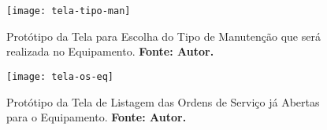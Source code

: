 \begin{apendicesenv}
\graphicspath{{figuras/prototipos/}}
\begin{figure}[H]
\centering
\texttt{[image: tela-tipo-man]}
\caption{Protótipo da Tela para Escolha do Tipo de Manutenção que será realizada no Equipamento. \textbf{Fonte: Autor.}}
\label{tela-tipo-man}
\end{figure}



\graphicspath{{figuras/prototipos/}}
\begin{figure}[H]
\centering
\texttt{[image: tela-os-eq]}
\caption{Protótipo da Tela de Listagem das Ordens de Serviço já Abertas para o Equipamento. \textbf{Fonte: Autor.}}
\label{tela-os-eq}
\end{figure}

\end{apendicesenv}